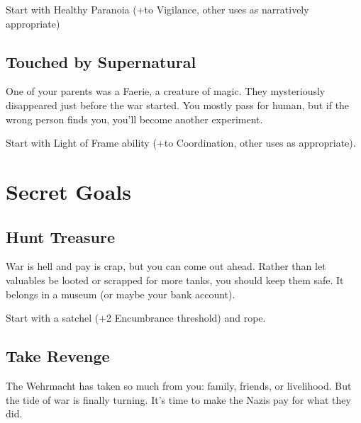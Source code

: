 \documentclass{book}
\newcommand{\bbb}{\BoostDie }
\begin{document}
\begin{multicols}{2}
Start with Healthy Paranoia (+\bbb to Vigilance, other uses as narratively appropriate)

%
%

\subsection{Touched by Supernatural}

One of your parents was a Faerie, a creature of magic.  They mysteriously disappeared just before the war started.  You mostly pass for human, but if the wrong person finds you, you'll become another experiment.

Start with Light of Frame ability (+\bbb to Coordination, other uses as appropriate).

\section{Secret Goals}

\subsection{Hunt Treasure}

War is hell and pay is crap, but you can come out ahead.  Rather than let valuables be looted or scrapped for more tanks, you should keep them safe.  It belongs in a museum (or maybe your bank account).

Start with a satchel (+2 Encumbrance threshold) and rope.


\subsection{Take Revenge}

The Wehrmacht has taken so much from you: family, friends, or livelihood.  But the tide of war is finally turning.  It's time to make the Nazis pay for what they did.


\end{multicols}
\end{document}

